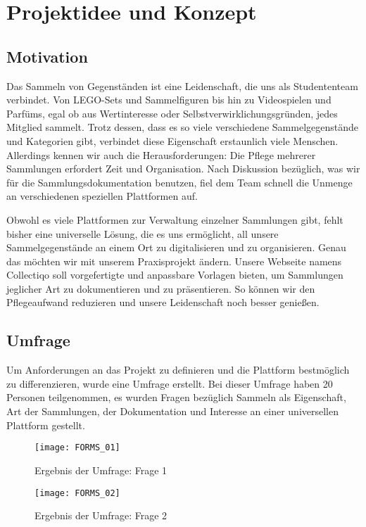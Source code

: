 \section{Projektidee und Konzept}\label{sec:projektidee-und-konzept}

\subsection{Motivation}\label{subsec:motivation}


Das Sammeln von Gegenständen ist eine Leidenschaft, die uns als Studententeam verbindet.
Von LEGO-Sets und Sammelfiguren bis hin zu Videospielen und Parfüms, egal ob aus Wertinteresse oder Selbstverwirklichungsgründen, jedes Mitglied sammelt.
Trotz dessen, dass es so viele verschiedene Sammelgegenstände und Kategorien gibt, verbindet diese Eigenschaft erstaunlich viele Menschen.
Allerdings kennen wir auch die Herausforderungen: Die Pflege mehrerer Sammlungen erfordert Zeit und Organisation.
Nach Diskussion bezüglich, was wir für die Sammlungsdokumentation benutzen, fiel dem Team schnell die Unmenge an verschiedenen speziellen Plattformen auf. \par
Obwohl es viele Plattformen zur Verwaltung einzelner Sammlungen gibt, fehlt bisher eine universelle Lösung, die es uns ermöglicht, all unsere Sammelgegenstände an einem Ort zu digitalisieren und zu organisieren.
Genau das möchten wir mit unserem Praxisprojekt ändern.
Unsere Webseite namens Collectiqo soll vorgefertigte und anpassbare Vorlagen bieten, um Sammlungen jeglicher Art zu dokumentieren und zu präsentieren.
So können wir den Pflegeaufwand reduzieren und unsere Leidenschaft noch besser genießen.


\subsection{Umfrage}\label{subsec:umfrage}

Um Anforderungen an das Projekt zu definieren und die Plattform bestmöglich zu differenzieren, wurde eine Umfrage erstellt.
Bei dieser Umfrage haben 20 Personen teilgenommen, es wurden Fragen bezüglich Sammeln als Eigenschaft, Art der Sammlungen, der Dokumentation und Interesse an einer universellen Plattform gestellt.

\begin{figure}[h]
    \centering
    \texttt{[image: FORMS\_01]}
    \caption{Ergebnis der Umfrage: Frage 1}
    \label{fig:forms_result_01}
\end{figure}
\begin{figure}[h]
    \centering
    \texttt{[image: FORMS\_02]}
    \caption{Ergebnis der Umfrage: Frage 2}
    \label{fig:forms_result_02}
\end{figure}


